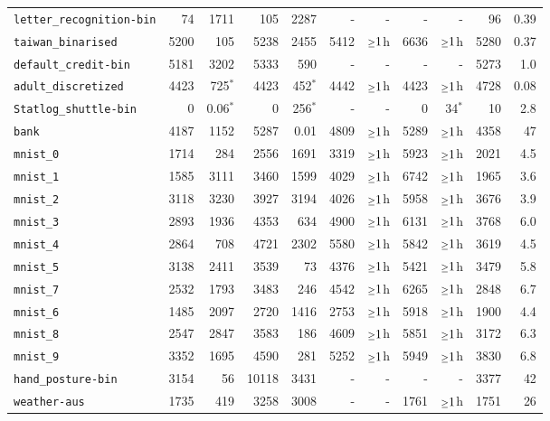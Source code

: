 \begin{tabular}{lrrrrrrrrrr}
\texttt{letter\_recognition-bin} & 74 & 1711 & 105 & 2287 & - & - & - & - & 96 & 0.39\\
\texttt{taiwan\_binarised} & 5200 & 105 & 5238 & 2455 & 5412 & $\mathsmaller{\geq}1$h & 6636 & $\mathsmaller{\geq}1$h & 5280 & 0.37\\
\texttt{default\_credit-bin} & 5181 & 3202 & 5333 & 590 & - & - & - & - & 5273 & 1.0\\
\texttt{adult\_discretized} & 4423 & 725$^*$ & 4423 & 452$^*$ & 4442 & $\mathsmaller{\geq}1$h & 4423 & $\mathsmaller{\geq}1$h & 4728 & 0.08\\
\texttt{Statlog\_shuttle-bin} & 0 & 0.06$^*$ & 0 & 256$^*$ & - & - & 0 & 34$^*$ & 10 & 2.8\\
\texttt{bank} & 4187 & 1152 & 5287 & 0.01 & 4809 & $\mathsmaller{\geq}1$h & 5289 & $\mathsmaller{\geq}1$h & 4358 & 47\\
\texttt{mnist\_0} & 1714 & 284 & 2556 & 1691 & 3319 & $\mathsmaller{\geq}1$h & 5923 & $\mathsmaller{\geq}1$h & 2021 & 4.5\\
\texttt{mnist\_1} & 1585 & 3111 & 3460 & 1599 & 4029 & $\mathsmaller{\geq}1$h & 6742 & $\mathsmaller{\geq}1$h & 1965 & 3.6\\
\texttt{mnist\_2} & 3118 & 3230 & 3927 & 3194 & 4026 & $\mathsmaller{\geq}1$h & 5958 & $\mathsmaller{\geq}1$h & 3676 & 3.9\\
\texttt{mnist\_3} & 2893 & 1936 & 4353 & 634 & 4900 & $\mathsmaller{\geq}1$h & 6131 & $\mathsmaller{\geq}1$h & 3768 & 6.0\\
\texttt{mnist\_4} & 2864 & 708 & 4721 & 2302 & 5580 & $\mathsmaller{\geq}1$h & 5842 & $\mathsmaller{\geq}1$h & 3619 & 4.5\\
\texttt{mnist\_5} & 3138 & 2411 & 3539 & 73 & 4376 & $\mathsmaller{\geq}1$h & 5421 & $\mathsmaller{\geq}1$h & 3479 & 5.8\\
\texttt{mnist\_7} & 2532 & 1793 & 3483 & 246 & 4542 & $\mathsmaller{\geq}1$h & 6265 & $\mathsmaller{\geq}1$h & 2848 & 6.7\\
\texttt{mnist\_6} & 1485 & 2097 & 2720 & 1416 & 2753 & $\mathsmaller{\geq}1$h & 5918 & $\mathsmaller{\geq}1$h & 1900 & 4.4\\
\texttt{mnist\_8} & 2547 & 2847 & 3583 & 186 & 4609 & $\mathsmaller{\geq}1$h & 5851 & $\mathsmaller{\geq}1$h & 3172 & 6.3\\
\texttt{mnist\_9} & 3352 & 1695 & 4590 & 281 & 5252 & $\mathsmaller{\geq}1$h & 5949 & $\mathsmaller{\geq}1$h & 3830 & 6.8\\
\texttt{hand\_posture-bin} & 3154 & 56 & 10118 & 3431 & - & - & - & - & 3377 & 42\\
\texttt{weather-aus} & 1735 & 419 & 3258 & 3008 & - & - & 1761 & $\mathsmaller{\geq}1$h & 1751 & 26\\
\bottomrule
\end{tabular}
